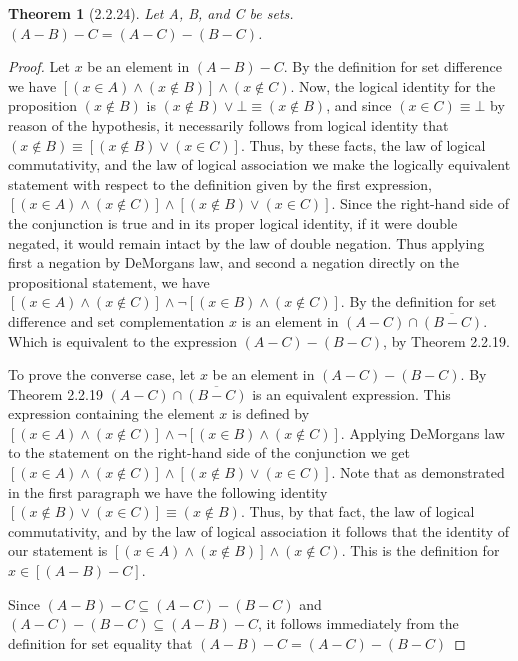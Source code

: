 \documentclass[a4paper, 12pt]{article}
\theoremstyle{plain}
\newtheorem*{theorem*}{Theorem}
\begin{document}
	
	\begin{theorem*}[2.2.24]
		Let A, B, and C be sets. $(A - B) - C = (A - C) - (B - C)$.
	\end{theorem*}
	
	\begin{proof}
		Let $x$ be an element in $(A - B) - C$. By the definition for set difference we have $[(x \in A) \land (x \notin B)] \land (x \notin C)$.  Now, the logical identity for the proposition $(x \notin B)$ is $(x \notin B) \lor \bot \equiv (x \notin B)$, and since \newline $(x \in C) \equiv \bot$ by reason of the hypothesis, it necessarily follows from logical identity that $(x \notin B) \equiv [(x \notin B) \lor (x \in C)]$. Thus, by these facts, the law of logical commutativity, and the law of logical association we make the logically equivalent statement with respect to the definition given by the first expression, $[(x \in A) \land (x \notin C)] \land [(x \notin B) \lor (x \in C)]$. Since the right-hand side of the conjunction is true and in its proper logical identity, if it were double negated, it would remain intact by the law of double negation. Thus applying first a negation by DeMorgans law, and second a negation directly on the propositional statement, we have $[(x \in A) \land (x \notin C)] \land \lnot [(x \in B) \land (x \notin C)]$. By the definition for set difference and set complementation $x$ is an element in $(A - C) \cap \overline{(B - C)}$. Which is equivalent to the expression $(A - C) - (B - C)$, by Theorem 2.2.19.
		
		To prove the converse case, let $x$ be an element in $(A - C) - (B - C)$. By Theorem 2.2.19  $(A - C) \cap \overline{(B - C)}$ is an equivalent expression. This expression containing the element $x$ is defined by \newline $[(x \in A) \land (x \notin C)] \land \lnot [(x \in B) \land (x \notin C)]$. Applying DeMorgans law to the statement on the right-hand side of the conjunction we get \newline $[(x \in A) \land (x \notin C)] \land [(x \notin B) \lor (x \in C)]$. Note that as demonstrated in the first paragraph we have the following identity $[(x \notin B) \lor (x \in C)] \equiv (x \notin B)$. Thus, by that fact, the law of logical commutativity, and by the law of logical association it follows that the identity of our statement is \newline $[(x \in A) \land (x \notin B)] \land (x \notin C)$. This is the definition for $x \in [(A - B) - C]$.
		
		Since $(A - B) - C \subseteq (A - C) - (B - C)$ and \newline $(A - C) - (B - C) \subseteq (A - B) - C$, it follows immediately from the definition for set equality that $(A - B) - C = (A - C) - (B - C)$
	\end{proof}
\end{document}
